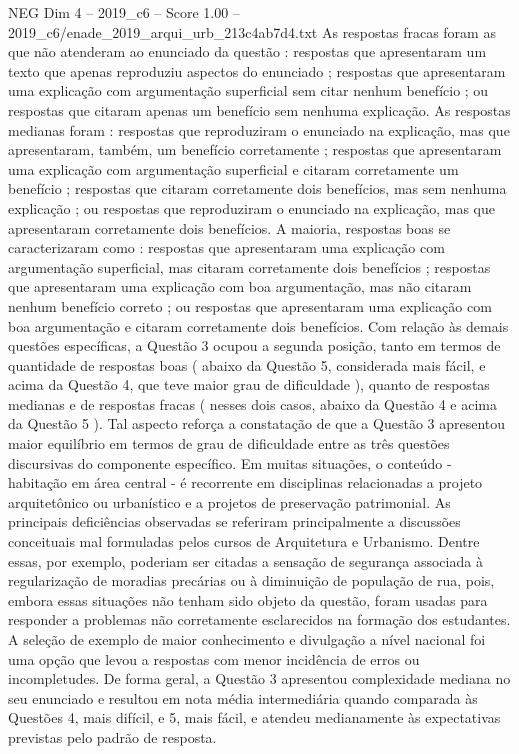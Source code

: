 \begin{textsample}{NEG Dim 4 – 2019\_c6 – Score 1.00 – 2019\_c6/enade\_2019\_arqui\_urb\_213c4ab7d4.txt}
As respostas fracas foram as que não atenderam ao enunciado da questão : respostas que apresentaram um texto que apenas reproduziu aspectos do enunciado ; respostas que apresentaram uma explicação com argumentação superficial sem citar nenhum benefício ; ou respostas que citaram apenas um benefício sem nenhuma explicação.
As respostas medianas foram : respostas que reproduziram o enunciado na explicação, mas que apresentaram, também, um benefício corretamente ; respostas que apresentaram uma explicação com argumentação superficial e citaram corretamente um benefício ; respostas que citaram corretamente dois benefícios, mas sem nenhuma explicação ; ou respostas que reproduziram o enunciado na explicação, mas que apresentaram corretamente dois benefícios.
A maioria, respostas boas se caracterizaram como : respostas que apresentaram uma explicação com argumentação superficial, mas citaram corretamente dois benefícios ; respostas que apresentaram uma explicação com boa argumentação, mas não citaram nenhum benefício correto ; ou respostas que apresentaram uma explicação com boa argumentação e citaram corretamente dois benefícios.
Com relação às demais questões específicas, a Questão 3 ocupou a segunda posição, tanto em termos de quantidade de respostas boas ( abaixo da Questão 5, considerada mais fácil, e acima da Questão 4, que teve maior grau de dificuldade ), quanto de respostas medianas e de respostas fracas ( nesses dois casos, abaixo da Questão 4 e acima da Questão 5 ).
Tal aspecto reforça a constatação de que a Questão 3 apresentou maior equilíbrio em termos de grau de dificuldade entre as três questões discursivas do componente específico.
Em muitas situações, o conteúdo - habitação em área central - é recorrente em disciplinas relacionadas a projeto arquitetônico ou urbanístico e a projetos de preservação patrimonial.
As principais deficiências observadas se referiram principalmente a discussões conceituais mal formuladas pelos cursos de Arquitetura e Urbanismo.
Dentre essas, por exemplo, poderiam ser citadas a sensação de segurança associada à regularização de moradias precárias ou à diminuição de população de rua, pois, embora essas situações não tenham sido objeto da questão, foram usadas para responder a problemas não corretamente esclarecidos na formação dos estudantes.
A seleção de exemplo de maior conhecimento e divulgação a nível nacional foi uma opção que levou a respostas com menor incidência de erros ou incompletudes.
De forma geral, a Questão 3 apresentou complexidade mediana no seu enunciado e resultou em nota média intermediária quando comparada às Questões 4, mais difícil, e 5, mais fácil, e atendeu medianamente às expectativas previstas pelo padrão de resposta.

\end{textsample}
